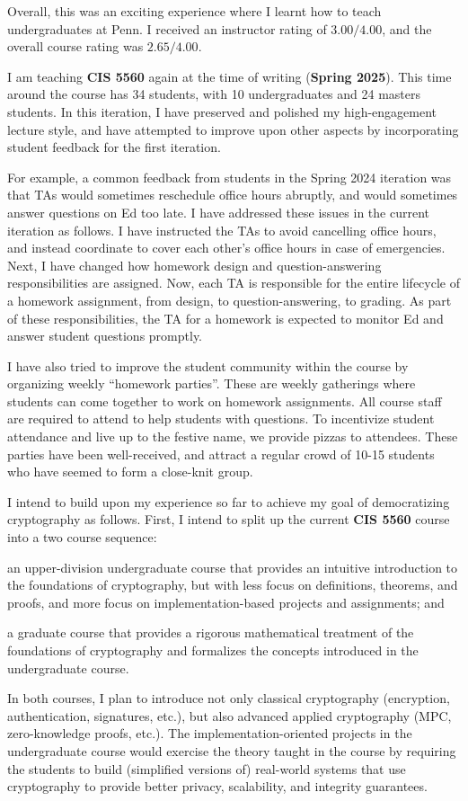 \documentclass[11pt,letterpaper]{article}
\begin{document}
Overall, this was an exciting experience where I learnt how to teach undergraduates at Penn.
I received an instructor rating of $3.00/4.00$, and the overall course rating was $2.65/4.00$.

I am teaching \textbf{CIS 5560} again at the time of writing (\textbf{Spring 2025}).
This time around the course has 34 students, with 10 undergraduates and 24 masters students.
In this iteration, I have preserved and polished my high-engagement lecture style, and have attempted to improve upon other aspects by incorporating student feedback for the first iteration.

For example, a common feedback from students in the Spring 2024 iteration was that TAs would sometimes reschedule office hours abruptly, and would sometimes answer questions on Ed too late.
I have addressed these issues in the current iteration as follows.
I have instructed the TAs to avoid cancelling office hours, and instead coordinate to cover each other's office hours in case of emergencies.
Next, I have changed how homework design and question-answering responsibilities are assigned.
Now, each TA is responsible for the entire lifecycle of a homework assignment, from design, to question-answering, to grading.
As part of these responsibilities, the TA for a homework is expected to monitor Ed and answer student questions promptly.

I have also tried to improve the student community within the course by organizing weekly ``homework parties''. 
These are weekly gatherings where students can come together to work on homework assignments. 
All course staff are required to attend to help students with questions.
To incentivize student attendance and live up to the festive name, we provide pizzas to attendees.
These parties have been well-received, and attract a regular crowd of 10-15 students who have seemed to form a close-knit group.

I intend to build upon my experience so far to achieve my goal of democratizing cryptography as follows.
First, I intend to split up the current \textbf{CIS 5560} course into a two course sequence: 
\begin{enumerate*}[(a)]
  \item an upper-division undergraduate course that provides an intuitive introduction to the foundations of cryptography, but with less focus on definitions, theorems, and proofs, and more focus on implementation-based projects and assignments; and 
    
  \item a graduate course that provides a rigorous mathematical treatment of the foundations of cryptography and formalizes the concepts introduced in the undergraduate course.
\end{enumerate*}
In both courses, I plan to introduce not only classical cryptography (encryption, authentication, signatures, etc.), but also advanced applied cryptography (MPC, zero-knowledge proofs, etc.).
The implementation-oriented projects in the undergraduate course would exercise the theory taught in the course by requiring the students to build (simplified versions of) real-world systems that use cryptography to provide better privacy, scalability, and integrity guarantees.
\end{document}
